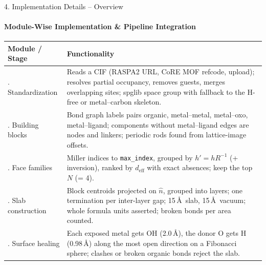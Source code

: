 \documentclass[aspectratio=169, 11pt]{beamer}
\begin{document}
\begin{frame}[shrink=4]{4. Implementation Details -- Overview}
    \framesubtitle{Module-Wise Implementation \& Pipeline Integration}
    \begin{table}
        \centering
        \scriptsize
        \renewcommand{\arraystretch}{1.18}
        \begin{tabular}{>{\raggedright\arraybackslash}p{3.0cm} >{\raggedright\arraybackslash}p{11.4cm}}
            \toprule
            \textbf{Module / Stage} & \textbf{Functionality} \\
            \midrule
            1. Standardization & Reads a CIF (RASPA2 URL, CoRE MOF refcode, upload); resolves partial occupancy, removes guests, merges overlapping sites; spglib space group with fallback to the H-free or metal--carbon skeleton. \\
            2. Building blocks & Bond graph labels pairs organic, metal--metal, metal--oxo, metal--ligand; components without metal--ligand edges are nodes and linkers; periodic rods found from lattice-image offsets. \\
            3. Face families & Miller indices to \texttt{max\_index}, grouped by $h' = hR^{-1}$ (+ inversion), ranked by $d_\text{eff}$ with exact absences; keep the top $N$ (= 4). \\
            4. Slab construction & Block centroids projected on $\hat n$, grouped into layers; one termination per inter-layer gap; 15\,\AA\ slab, 15\,\AA\ vacuum; whole formula units asserted; broken bonds per area counted. \\
            5. Surface healing & Each exposed metal gets OH (2.0\,\AA), the donor O gets H (0.98\,\AA) along the most open direction on a Fibonacci sphere; clashes or broken organic bonds reject the slab. \\
            \bottomrule
        \end{tabular}
    \end{table}
\end{frame}
\end{document}
